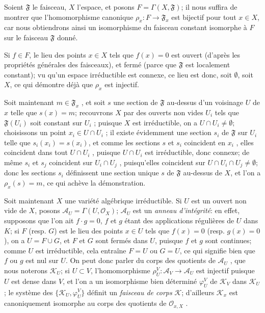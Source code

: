 Soient $\mathfrak{F}$ le faisceau, $X$ l'espace, et posons $F = \Gamma(X, \mathfrak{F})$; il nous suffira de montrer que l'homomorphisme canonique $\rho_x\colon F \to \mathfrak{F}_x$ est bijectif pour tout $x \in X$, car nous obtiendrons ainsi un isomorphisme du faisceau constant isomorphe à $F$ sur le faisceau $\mathfrak{F}$ donné.

Si $f \in F$, le lieu des points $x \in X$ tels que $f(x) = 0$ est ouvert (d'après les propriétés générales des faisceaux), et fermé (parce que $\mathfrak{F}$ est localement constant); vu qu'un espace irréductible est connexe, ce lieu est donc, soit $\emptyset$, soit $X$, ce qui démontre déjà que $\rho_x$ est injectif.

Soit maintenant $m \in \mathfrak{F}_x$ , et soit $s$ une section de $\mathfrak{F}$ au-dessus d'un voisinage $U$ de $x$ telle que $s(x) = m$; recouvrons $X$ par des ouverts non vides $U_i$ tels que $\mathfrak{F}(U_i)$ soit constant sur $U_i$ ; puisque $X$ est irréductible, on a $U \cap U_i \neq \emptyset$; choisissons un point $x_i \in U \cap U_i$ ; il existe évidemment une section $s_i$ de $\mathfrak{F}$ sur $U_i$ telle que $s_i(x_i) = s(x_i)$, et comme les sections $s$ et $s_i$ coincident en $x_i$ , elles coincident dans tout $U \cap U_i$ , puisque $U \cap U_i$ est irréductible, donc connexe; de même $s_i$ et $s_j$ coincident sur $U_i \cap U_j$ , puisqu'elles coincident sur $U \cap U_i \cap U_j \neq \emptyset$; donc les sections $s_i$ définissent une section unique $s$ de $\mathfrak{F}$ au-dessus de $X$, et l'on a $\rho_x(s) = m$, ce qui achève la démonstration.

Soit maintenant $X$ une variété algébrique irréductible. Si $U$ est un ouvert non vide de $X$, posons $\mathcal{A}_U = \Gamma(U, \mathcal{O}_X)$; $\mathcal{A}_U$ est un \textit{anneau d'intégrité}: en effet, supposons que l'on ait $f \cdot g = 0$, $f$ et $g$ étant des applications régulières de $U$ dans $K$; si $F$ (resp. $G$) est le lieu des points $x \in U$ tels que $f(x) = 0$ (resp. $g(x) = 0$), on a $U = F \cup G$, et $F$ et $G$ sont fermés dans $U$, puisque $f$ et $g$ sont continues; comme $U$ est irréductible, cela entraîne $F = U$ ou $G = U$, ce qui signifie bien que $f$ ou $g$ est nul sur $U$. On peut donc parler du corps des quotients de $\mathcal{A}_U$ , que nous noterons $\mathcal{K}_U$; si $U \subset V$, l'homomorphisme $\rho_U^V\colon \mathcal{A}_V \to \mathcal{A}_U$ est injectif puisque $U$ est dense dans $V$, et l'on a un isomorphisme bien déterminé $\varphi_U^V$ de $\mathcal{K}_V$ dans $\mathcal{K}_U$ ; le système des $\{\mathcal{K}_U , \varphi_U^V\}$ définit un \textit{faisceau de corps} $\mathcal{K}$; d'ailleurs $\mathcal{K}_x$ est canoniquement isomorphe au corps des quotients de $\mathcal{O}_{x,X}$ .

